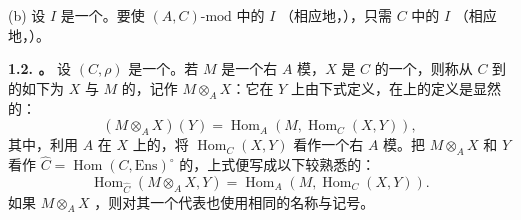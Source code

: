 (b) 设 $I$ 是一个。要使 $(A,C)\text{-}\mathrm{mod}$ 中的 $I$ （相应地，），只需 $C$ 中的 $I$ （相应地，）。

\textbf{1.2. 。} 设 $(C,\rho)$ 是一个。若 $M$ 是一个右 $A$ 模，$X$ 是 $C$ 的一个，则称从 $C$ 到的如下为 $X$ 与 $M$ 的，记作 $M\otimes_A X$：它在 $Y$ 上由下式定义，在上的定义是显然的：
\[
(M\otimes_A X)(Y)=\operatorname{Hom}_A(M,\operatorname{Hom}_C(X,Y)),
\]
其中，利用 $A$ 在 $X$ 上的，将 $\operatorname{Hom}_C(X,Y)$ 看作一个右 $A$ 模。把 $M\otimes_A X$ 和 $Y$ 看作 $\widehat C=\operatorname{Hom}(C,\mathrm{Ens})^\circ$ 的，上式便写成以下较熟悉的：
\[
\operatorname{Hom}_{\widehat C}(M\otimes_A X,Y)=\operatorname{Hom}_A(M,\operatorname{Hom}_C(X,Y)).
\]
如果 $M\otimes_A X$ ，则对其一个代表也使用相同的名称与记号。

